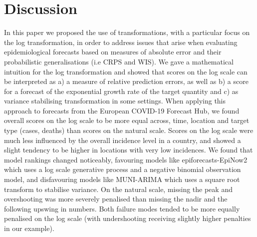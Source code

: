 \documentclass{article}
\begin{document}
\section{Discussion}
\label{sec:discussion}

In this paper we proposed the use of transformations, with a particular focus on the log transformation, in order to address issues that arise when evaluating epidemiological forecasts based on measures of absolute error and their probabilistic generalisations (i.e CRPS and WIS). We gave a mathematical intuition for the log transformation and showed that scores on the log scale can be interpreted as a) a measure of relative prediction errors, as well as b) a score for a forecast of the exponential growth rate of the target quantity and c) as variance stabilising transformation in some settings.
When applying this approach to forecasts from the European COVID-19 Forecast Hub, we found overall scores on the log scale to be more equal across, time, location and target type (cases, deaths) than scores on the natural scale. Scores on the log scale were much less influenced by the overall incidence level in a country, and showed a slight tendency to be higher in locations with very low incidences. We found that model rankings changed noticeably, favouring models like epiforecasts-EpiNow2 which uses a log scale generative process and a negative binomial observation model, and disfavouring models like MUNI-ARIMA which uses a square root transform to stabilise variance. On the natural scale, missing the peak and overshooting was more severely penalised than missing the nadir and the following upswing in numbers. Both failure modes tended to be more equally penalised on the log scale (with undershooting receiving slightly higher penalties in our example). 
\end{document}
